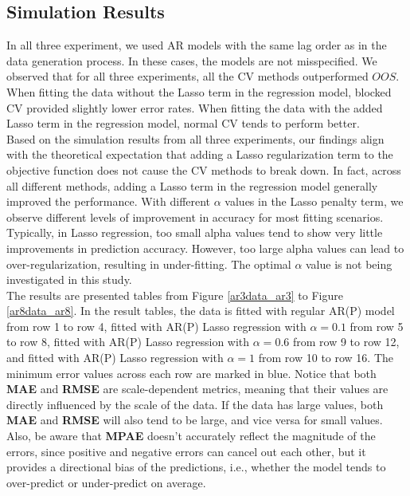\documentclass[12pt, oneside]{amsart}
\theoremstyle{definition}
\theoremstyle{remark}
\numberwithin{equation}{section}
\begin{document}
\subsection{Simulation Results}
In all three experiment, we used AR models with the same lag order as in the data generation process. In these cases, the models are not misspecified. We observed that for all three experiments, all the CV methods outperformed $OOS$. When fitting the data without the Lasso term in the regression model, blocked CV provided slightly lower error rates. When fitting the data with the added Lasso term in the regression model, normal CV tends to perform better. \\

Based on the simulation results from all three experiments, our findings align with the theoretical expectation that adding a Lasso regularization term to the objective function does not cause the CV methods to break down. In fact, across all different methods, adding a Lasso term in the regression model generally improved the performance. With different $\alpha$ values in the Lasso penalty term, we observe different levels of improvement in accuracy for most fitting scenarios. Typically, in Lasso regression, too small alpha values tend to show very little improvements in prediction accuracy. However, too large alpha values can lead to over-regularization, resulting in under-fitting. The optimal $\alpha$ value is not being investigated in this study.\\

The results are presented tables from Figure \ref{ar3data_ar3} to Figure \ref{ar8data_ar8}. In the result tables, the data is fitted with regular AR(P) model from row 1 to row 4, fitted with AR(P) Lasso regression with $\alpha = 0.1$ from row 5 to row 8, fitted with AR(P) Lasso regression with $\alpha = 0.6$ from row 9 to row 12, and fitted with AR(P) Lasso regression with $\alpha = 1$ from row 10 to row 16. The minimum error values across  each row are marked in blue. Notice that both \textbf{MAE} and \textbf{RMSE} are scale-dependent metrics, meaning that their values are directly influenced by the scale of the data. If the data has large values, both \textbf{MAE} and \textbf{RMSE} will also tend to be large, and vice versa for small values. Also, be aware that \textbf{MPAE} doesn't accurately reflect the magnitude of the errors, since positive and negative errors can cancel out each other, but it provides a directional bias of the predictions, i.e., whether the model tends to over-predict or under-predict on average. 
\end{document}
